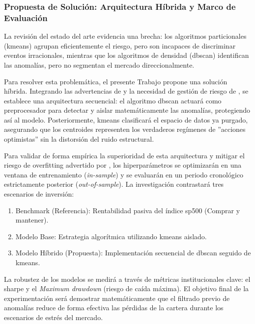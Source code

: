 \documentclass[
]{article}
\begin{document}
	\subsubsection{Propuesta de Solución: Arquitectura Híbrida y Marco de
		Evaluación}\label{propuesta-de-soluciuxf3n-arquitectura-huxedbrida-y-marco-de-evaluaciuxf3n}
	
	La revisión del estado del arte evidencia una brecha: los algoritmos
	particionales (\gls{kmeans}) agrupan eficientemente el riesgo, pero son
	incapaces de discriminar eventos irracionales, mientras que los
	algoritmos de densidad (\gls{dbscan}) identifican las anomalías, pero no
	segmentan el mercado direccionalmente.
	
	Para resolver esta problemática, el presente Trabajo propone una
	solución híbrida. Integrando las advertencias de \textcite{shiraj2024anomaly}
	y la necesidad de gestión de riesgo de \textcite{aslam2025identifying}, se establece una
	arquitectura secuencial: el algoritmo \gls{dbscan} actuará como preprocesador
	para detectar y aislar matemáticamente las anomalías, protegiendo así al
	modelo. Posteriormente, \gls{kmeans} clasificará el espacio de datos ya
	purgado, asegurando que los centroides representen los verdaderos
	regímenes de ''acciones optimistas'' sin la distorsión del ruido
	estructural.
	
	Para validar de forma empírica la superioridad de esta arquitectura y
	mitigar el riesgo de \gls{overfitting} advertido por
	\textcite{lopezdeprado2018}, los hiperparámetros se optimizarán en una
	ventana de entrenamiento (\emph{in-sample}) y se evaluarán en un periodo
	cronológico estrictamente posterior (\emph{out-of-sample}). La
	investigación contrastará tres escenarios de inversión:
	
	\begin{enumerate}
		\def\labelenumi{\arabic{enumi}.}
		\item
		Benchmark (Referencia): Rentabilidad pasiva del índice \gls{sp500}
		(Comprar y mantener).
		\item
		Modelo Base: Estrategia algorítmica utilizando \gls{kmeans} aislado.
		\item
		Modelo Híbrido (Propuesta): Implementación secuencial de \gls{dbscan}
		seguido de \gls{kmeans}.
	\end{enumerate}
	
	La robustez de los modelos se medirá a través de métricas
	institucionales clave: el \gls{sharpe} y el \emph{Maximum \gls{drawdown}} (riesgo de caída máxima). El
	objetivo final de la experimentación será demostrar matemáticamente que
	el filtrado previo de anomalías reduce de forma efectiva las pérdidas de
	la cartera durante los escenarios de estrés del mercado.
	
\end{document}
